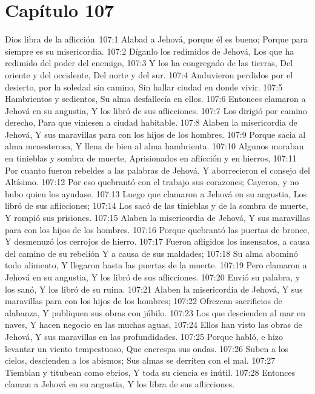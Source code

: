 \section*{Capítulo 107}
Dios libra de la aflicción 107:1 Alabad a Jehová, porque él es bueno; 
Porque para siempre es su misericordia. 
107:2 Díganlo los redimidos de Jehová, 
Los que ha redimido del poder del enemigo, 
107:3 Y los ha congregado de las tierras, 
Del oriente y del occidente, 
Del norte y del sur. 
107:4 Anduvieron perdidos por el desierto, por la soledad sin camino, 
Sin hallar ciudad en donde vivir. 
107:5 Hambrientos y sedientos, 
Su alma desfallecía en ellos. 
107:6 Entonces clamaron a Jehová en su angustia, 
Y los libró de sus aflicciones. 
107:7 Los dirigió por camino derecho, 
Para que viniesen a ciudad habitable. 
107:8 Alaben la misericordia de Jehová, 
Y sus maravillas para con los hijos de los hombres. 
107:9 Porque sacia al alma menesterosa, 
Y llena de bien al alma hambrienta. 
107:10 Algunos moraban en tinieblas y sombra de muerte, 
Aprisionados en aflicción y en hierros, 
107:11 Por cuanto fueron rebeldes a las palabras de Jehová, 
Y aborrecieron el consejo del Altísimo. 
107:12 Por eso quebrantó con el trabajo sus corazones; 
Cayeron, y no hubo quien los ayudase. 
107:13 Luego que clamaron a Jehová en su angustia, 
Los libró de sus aflicciones; 
107:14 Los sacó de las tinieblas y de la sombra de muerte, 
Y rompió sus prisiones. 
107:15 Alaben la misericordia de Jehová, 
Y sus maravillas para con los hijos de los hombres. 
107:16 Porque quebrantó las puertas de bronce, 
Y desmenuzó los cerrojos de hierro. 
107:17 Fueron afligidos los insensatos, a causa del camino de su rebelión 
Y a causa de sus maldades; 
107:18 Su alma abominó todo alimento, 
Y llegaron hasta las puertas de la muerte. 
107:19 Pero clamaron a Jehová en su angustia, 
Y los libró de sus aflicciones. 
107:20 Envió su palabra, y los sanó, 
Y los libró de su ruina. 
107:21 Alaben la misericordia de Jehová, 
Y sus maravillas para con los hijos de los hombres; 
107:22 Ofrezcan sacrificios de alabanza, 
Y publiquen sus obras con júbilo. 
107:23 Los que descienden al mar en naves, 
Y hacen negocio en las muchas aguas, 
107:24 Ellos han visto las obras de Jehová, 
Y sus maravillas en las profundidades. 
107:25 Porque habló, e hizo levantar un viento tempestuoso, 
Que encrespa sus ondas. 
107:26 Suben a los cielos, descienden a los abismos; 
Sus almas se derriten con el mal. 
107:27 Tiemblan y titubean como ebrios, 
Y toda su ciencia es inútil. 
107:28 Entonces claman a Jehová en su angustia, 
Y los libra de sus aflicciones. 
